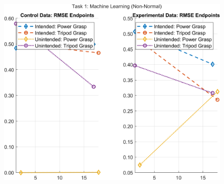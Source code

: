 \documentclass[12pt]{article}
\newcommand\figWidth{7in}
\begin{document}
\begin{figure}
    \includegraphics[width = \figWidth]{t1-spaghetti-xnorm.png}
\end{figure}
\end{document}
